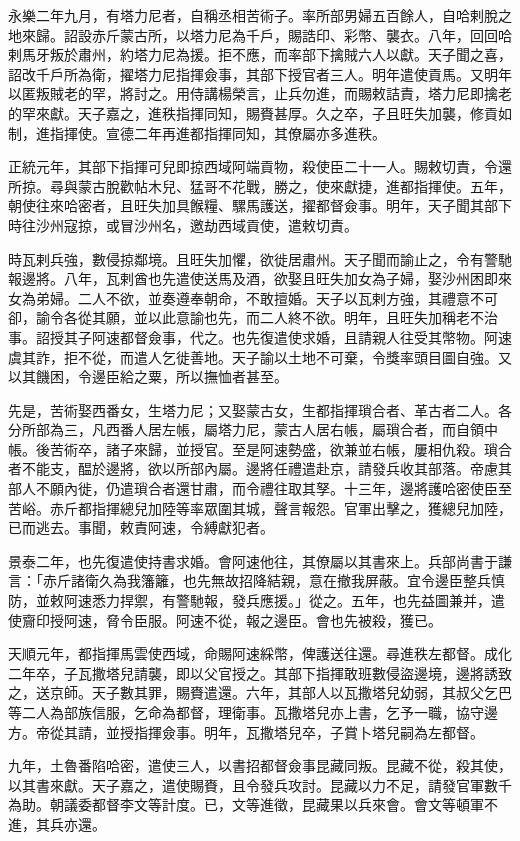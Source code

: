 \begin{pinyinscope}
永樂二年九月，有塔力尼者，自稱丞相苦術子。率所部男婦五百餘人，自哈剌脫之地來歸。詔設赤斤蒙古所，以塔力尼為千戶，賜誥印、彩幣、襲衣。八年，回回哈剌馬牙叛於肅州，約塔力尼為援。拒不應，而率部下擒賊六人以獻。天子聞之喜，詔改千戶所為衛，擢塔力尼指揮僉事，其部下授官者三人。明年遣使貢馬。又明年以匿叛賊老的罕，將討之。用侍講楊榮言，止兵勿進，而賜敕詰責，塔力尼即擒老的罕來獻。天子嘉之，進秩指揮同知，賜賚甚厚。久之卒，子且旺失加襲，修貢如制，進指揮使。宣德二年再進都指揮同知，其僚屬亦多進秩。

正統元年，其部下指揮可兒即掠西域阿端貢物，殺使臣二十一人。賜敕切責，令還所掠。尋與蒙古脫歡帖木兒、猛哥不花戰，勝之，使來獻捷，進都指揮使。五年，朝使往來哈密者，且旺失加具餱糧、騾馬護送，擢都督僉事。明年，天子聞其部下時往沙州寇掠，或冒沙州名，邀劫西域貢使，遣敕切責。

時瓦剌兵強，數侵掠鄰境。且旺失加懼，欲徙居肅州。天子聞而諭止之，令有警馳報邊將。八年，瓦剌酋也先遣使送馬及酒，欲娶且旺失加女為子婦，娶沙州困即來女為弟婦。二人不欲，並奏遵奉朝命，不敢擅婚。天子以瓦剌方強，其禮意不可卻，諭令各從其願，並以此意諭也先，而二人終不欲。明年，且旺失加稱老不治事。詔授其子阿速都督僉事，代之。也先復遣使求婚，且請親人往受其幣物。阿速虞其詐，拒不從，而遣人乞徙善地。天子諭以土地不可棄，令獎率頭目圖自強。又以其饑困，令邊臣給之粟，所以撫恤者甚至。

先是，苦術娶西番女，生塔力尼；又娶蒙古女，生都指揮瑣合者、革古者二人。各分所部為三，凡西番人居左帳，屬塔力尼，蒙古人居右帳，屬瑣合者，而自領中帳。後苦術卒，諸子來歸，並授官。至是阿速勢盛，欲兼並右帳，屢相仇殺。瑣合者不能支，醖於邊將，欲以所部內屬。邊將任禮遣赴京，請發兵收其部落。帝慮其部人不願內徙，仍遣瑣合者還甘肅，而令禮往取其孥。十三年，邊將護哈密使臣至苦峪。赤斤都指揮總兒加陸等率眾圍其城，聲言報怨。官軍出擊之，獲總兒加陸，已而逃去。事聞，敕責阿速，令縛獻犯者。

景泰二年，也先復遣使持書求婚。會阿速他往，其僚屬以其書來上。兵部尚書于謙言：「赤斤諸衛久為我籓籬，也先無故招降結親，意在撤我屏蔽。宜令邊臣整兵慎防，並敕阿速悉力捍禦，有警馳報，發兵應援。」從之。五年，也先益圖兼并，遣使齎印授阿速，脅令臣服。阿速不從，報之邊臣。會也先被殺，獲已。

天順元年，都指揮馬雲使西域，命賜阿速綵幣，俾護送往還。尋進秩左都督。成化二年卒，子瓦撒塔兒請襲，即以父官授之。其部下指揮敢班數侵盜邊境，邊將誘致之，送京師。天子數其罪，賜賚遣還。六年，其部人以瓦撒塔兒幼弱，其叔父乞巴等二人為部族信服，乞命為都督，理衛事。瓦撒塔兒亦上書，乞予一職，協守邊方。帝從其請，並授指揮僉事。明年，瓦撒塔兒卒，子賞卜塔兒嗣為左都督。

九年，土魯番陷哈密，遣使三人，以書招都督僉事昆藏同叛。昆藏不從，殺其使，以其書來獻。天子嘉之，遣使賜賚，且令發兵攻討。昆藏以力不足，請發官軍數千為助。朝議委都督李文等計度。已，文等進徵，昆藏果以兵來會。會文等頓軍不進，其兵亦還。


\end{pinyinscope}
